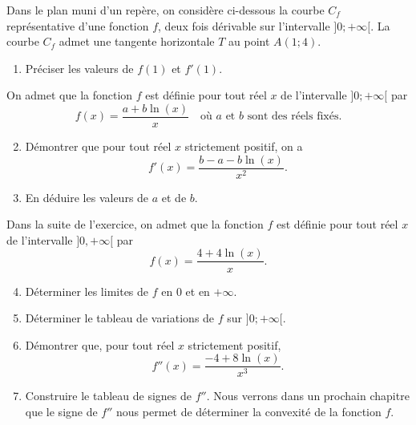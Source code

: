 \documentclass[11pt,fleqn, openany]{book} %
\begin{document}
\begin{exercise}[subtitle={(Amérique du Nord 2021)}] Dans le plan muni d'un repère, on considère ci-dessous la courbe $C_f$
représentative d'une fonction $f$, deux fois dérivable sur l'intervalle $]0;+\infty[$. La courbe $C_f$ admet une tangente horizontale $T$ au point $A(1;4)$.

\begin{center}
\end{center}

\begin{enumerate}
\item Préciser les valeurs de $f(1)$ et $f'(1)$.
\end{enumerate}
On admet que la fonction $f$ est définie pour tout réel $x$ de l'intervalle $]0;+\infty [$ par
\[f(x)=\dfrac{a+b\ln(x)}{x} \quad \text{où } a \text{ et }b\text{ sont des réels fixés.}\]
\begin{enumerate}
\setcounter{enumi}{1}
\item Démontrer que pour tout réel $x$ strictement positif, on a
\[f'(x)=\dfrac{b-a-b\ln(x)}{x^2}.\]
\item En déduire les valeurs de $a$ et de $b$.
\end{enumerate}
Dans la suite de l'exercice, on admet que la fonction $f$ est définie pour tout réel $x$ de l'intervalle $]0,+\infty[$ par
\[f(x)=\dfrac{4+4\ln(x)}{x}.\]
\begin{enumerate}
\setcounter{enumi}{3}
\item Déterminer les limites de $f$ en $0$ et en $+\infty$.
\item Déterminer le tableau de variations de $f$ sur $]0;+\infty[$.
\item Démontrer que, pour tout réel $x$ strictement positif,
\[f''(x)=\dfrac{-4+8\ln(x)}{x^3}.\]
\item Construire le tableau de signes de $f''$. Nous verrons dans un prochain chapitre que le signe de $f''$ nous permet de déterminer la convexité de la fonction $f$.
\end{enumerate}
\newpage
\end{exercise}
\end{document}
